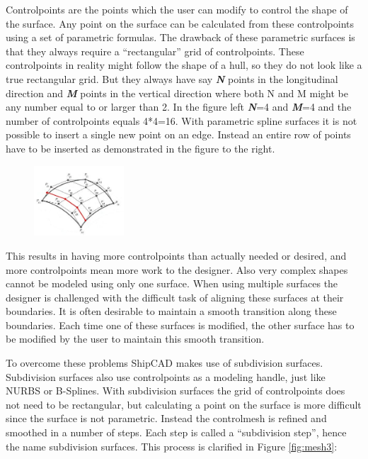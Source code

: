\documentclass[12pt]{article}
\begin{document}
Controlpoints are the points which the user can modify to control the
shape of the surface. Any point on the surface can be calculated from
these controlpoints using a set of parametric formulas. The drawback
of these parametric surfaces is that they always require a
“rectangular” grid of controlpoints. These controlpoints in reality
might follow the shape of a hull, so they do not look like a true
rectangular grid. But they always have say \textit{\textbf{N}} points
in the longitudinal direction and \textit{\textbf{M}} points in the
vertical direction where both N and M might be any number equal to or
larger than 2. In the figure left \textit{\textbf{N}}=4
and \textit{\textbf{M}}=4 and the number of controlpoints equals
4*4=16. With parametric spline surfaces it is not possible to insert a
single new point on an edge. Instead an entire row of points have to
be inserted as demonstrated in the figure to the right.

\begin{figure}
        \centering
        \includegraphics[width=0.3\textwidth,natwidth=300,natheight=233]{figure3.png}
        \caption{}
        \label{fig:mesh2}
\end{figure}

This results in having more controlpoints than actually needed or
desired, and more controlpoints mean more work to the designer. Also
very complex shapes cannot be modeled using only one surface. When
using multiple surfaces the designer is challenged with the difficult
task of aligning these surfaces at their boundaries. It is often
desirable to maintain a smooth transition along these boundaries. Each
time one of these surfaces is modified, the other surface has to be
modified by the user to maintain this smooth transition.

To overcome these problems ShipCAD makes use of subdivision
surfaces. Subdivision surfaces also use controlpoints as a modeling
handle, just like NURBS or B-Splines. With subdivision surfaces the
grid of controlpoints does not need to be rectangular, but calculating
a point on the surface is more difficult since the surface is not
parametric. Instead the controlmesh is refined and smoothed in a
number of steps. Each step is called a “subdivision step”, hence the
name subdivision surfaces. This process is clarified in
Figure \ref{fig:mesh3}:
\end{document}
